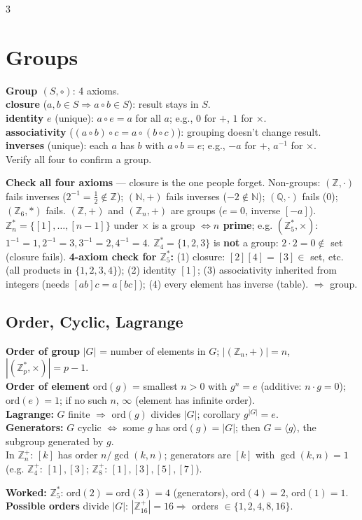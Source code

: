 \documentclass[9pt]{extarticle}
\newcommand{\hl}[1]{\textbf{\textcolor{BrickRed}{#1}}}
\begin{document}
\begin{multicols}{3}
\section{Groups}
\begin{kbox}\raggedright
\textbf{Group $(S,\circ)$}: 4 axioms.\\
\hl{closure} ($a,b\in S\Rightarrow a\circ b\in S$): result stays in $S$.\\
\hl{identity} $e$ (unique): $a\circ e=a$ for all $a$; e.g., $0$ for $+$, $1$ for $\times$.\\
\hl{associativity} ($(a\circ b)\circ c=a\circ(b\circ c)$): grouping doesn't change result.\\
\hl{inverses} (unique): each $a$ has $b$ with $a\circ b=e$; e.g., $-a$ for $+$, $a^{-1}$ for $\times$.\\
Verify all four to confirm a group.
\end{kbox}
\hl{Check all four axioms} --- closure is the one people forget. Non-groups: $(\mathbb Z,\cdot)$ fails inverses ($2^{-1}=\frac12\notin\mathbb Z$); $(\mathbb N,+)$ fails inverses ($-2\notin\mathbb N$); $(\mathbb Q,\cdot)$ fails ($0$); $(\mathbb Z_6,*)$ fails.
$(\mathbb Z,+)$ and $(\mathbb Z_n,+)$ are groups ($e{=}0$, inverse $[-a]$). $\mathbb Z_n^*=\{[1],\ldots,[n-1]\}$ under $\times$ is a group \hl{$\iff n$ prime}; e.g. $(\mathbb Z_5^*,\times)$: $1^{-1}=1,2^{-1}=3,3^{-1}=2,4^{-1}=4$. $\mathbb Z_4^*=\{1,2,3\}$ is \hl{not} a group: $2\cdot2=0\notin$ set (closure fails).
\textbf{4-axiom check for $\mathbb Z_5^*$:} (1) closure: $[2][4]=[3]\in$ set, etc. (all products in $\{1,2,3,4\}$); (2) identity $[1]$; (3) associativity inherited from integers (needs $[ab]c=a[bc]$); (4) every element has inverse (table). $\Rightarrow$ group.

\subsection{Order, Cyclic, Lagrange}
\begin{sloppypar}\raggedright
\hl{Order of group} $|G|$ = number of elements in $G$; $|(\mathbb Z_n,+)|=n$, $|(\mathbb Z_p^*,\times)|=p-1$.\\
\hl{Order of element} $\mathrm{ord}(g)$ = smallest $n>0$ with $g^n=e$ (additive: $n\cdot g=0$); $\mathrm{ord}(e)=1$; if no such $n$, $\infty$ (element has infinite order).\\
\hl{Lagrange:} $G$ finite $\Rightarrow$ $\mathrm{ord}(g)$ divides $|G|$; corollary $g^{|G|}=e$.\\
\hl{Generators:} $G$ cyclic $\iff$ some $g$ has $\mathrm{ord}(g)=|G|$; then $G=\langle g\rangle$, the subgroup generated by $g$.\\
In $\mathbb Z_n^+$: $[k]$ has order $n/\gcd(k,n)$; generators are $[k]$ with $\gcd(k,n)=1$ (e.g. $\mathbb Z_4^+$: $[1],[3]$; $\mathbb Z_8^+$: $[1],[3],[5],[7]$).
\end{sloppypar}
\textbf{Worked:} $\mathbb Z_5^*$: $\mathrm{ord}(2){=}\mathrm{ord}(3){=}4$ (generators), $\mathrm{ord}(4){=}2$, $\mathrm{ord}(1){=}1$. \hl{Possible orders} divide $|G|$: $|\mathbb Z_{16}^+|{=}16\Rightarrow$ orders $\in\{1,2,4,8,16\}$.


\end{multicols}
\end{document}
